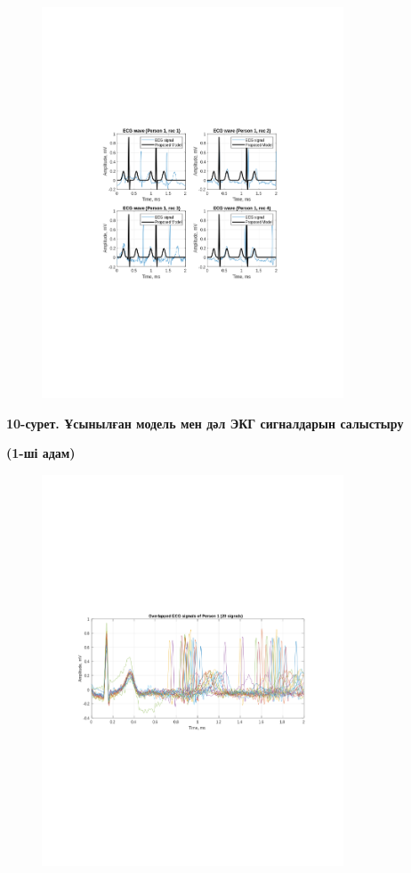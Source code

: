 {\begin{figure}[H]
	\centering
	\includegraphics[width=0.8\textwidth]{media/ict/image50}
	\caption*{}
\end{figure}


{\bfseries 10-сурет. Ұсынылған модель мен дәл ЭКГ сигналдарын салыстыру}

{\bfseries (1-ші адам)}

\begin{figure}[H]
	\centering
	\includegraphics[width=0.8\textwidth]{media/ict/image51}
	\caption*{}
\end{figure}


}
